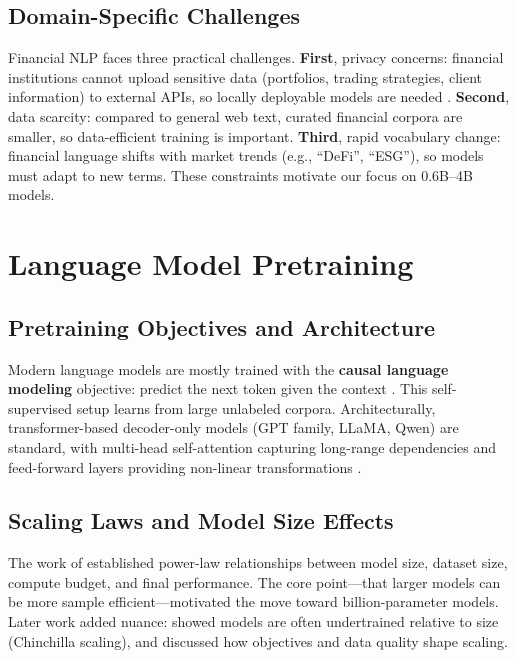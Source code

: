 \subsection{Domain-Specific Challenges}

Financial NLP faces three practical challenges. \textbf{First}, privacy concerns: financial institutions cannot upload sensitive data (portfolios, trading strategies, client information) to external APIs, so locally deployable models are needed \parencite{wu2023bloomberggpt}. \textbf{Second}, data scarcity: compared to general web text, curated financial corpora are smaller, so data-efficient training is important. \textbf{Third}, rapid vocabulary change: financial language shifts with market trends (e.g., ``DeFi'', ``ESG''), so models must adapt to new terms. These constraints motivate our focus on 0.6B–4B models.

\section{Language Model Pretraining}

\subsection{Pretraining Objectives and Architecture}

Modern language models are mostly trained with the \textbf{causal language modeling} objective: predict the next token given the context \parencite{radford2019language, brown2020language}. This self-supervised setup learns from large unlabeled corpora. Architecturally, transformer-based decoder-only models (GPT family, LLaMA, Qwen) are standard, with multi-head self-attention capturing long-range dependencies and feed-forward layers providing non-linear transformations \parencite{vaswani2017attention, touvron2023llama}.

\subsection{Scaling Laws and Model Size Effects}

The work of \textcite{kaplan2020scaling} established power-law relationships between model size, dataset size, compute budget, and final performance. The core point—that larger models can be more sample efficient—motivated the move toward billion-parameter models. Later work added nuance: \textcite{hoffmann2022training} showed models are often undertrained relative to size (Chinchilla scaling), and \textcite{tay2022ul2} discussed how objectives and data quality shape scaling.

